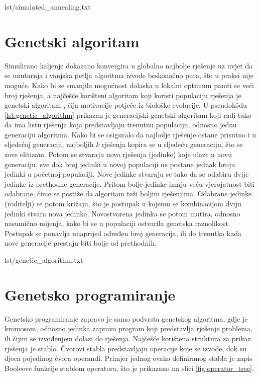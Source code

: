 \begin{minipage}{0.95\textwidth}
     {lst/simulated_annealing.txt}
\end{minipage}


\section{Genetski algoritam}
Simulirano kaljenje dokazano konvergira u globalno najbolje rješenje uz uvjet da se unutarnja i vanjska petlja algoritma izvode beskonačno puta, što u praksi nije moguće.
Kako bi se smanjila mogućnost dolaska u lokalni optimum pamti se veći broj rješenja, a najčešće korišteni algoritam koji koristi populaciju rješenja je genetski algoritam \cite{PrirodomInspirirani}, čija motivacije potječe iz biološke evolucije.
U pseudok\^{o}du \ref{lst:genetic_algorithm} prikazan je generacijski genetski algoritam koji radi tako da ima listu rješenja koja predstavljaju trenutnu populaciju, odnosno jednu generaciju algoritma.
Kako bi se osiguralo da najbolje rješenje ostane prisutno i u sljedećoj generaciji, najboljih $k$ rješenja kopira se u sljedeću generaciju, što se zove elitizam. 
Potom se stvaraju nova rješenja (jedinke) koje ulaze u novu generaciju, sve dok broj jedinki u novoj populaciji ne postane jednak broju jedinki u početnoj populaciji. 
Nove jedinke stvaraju se tako da se odabiru dvije jedinke iz prethodne generacije.
Pritom bolje jedinke imaju veću vjerojatnost biti odabrane, čime se postiže da algoritam teži boljim rješenjima.
Odabrane jedinke (roditelji) se potom križaju, što je postupak u kojemu se kombinacijom dviju jedinki stvara nova jedinka.
Novostvorena jedinka se potom mutira, odnosno nasumično mijenja, kako bi se u populaciji ostvarila genetska raznolikost.
Postupak se ponavlja unaprijed određen broj generacija, ili do trenutka kada nove generacije prestaju biti bolje od prethodnih.

\begin{minipage}{0.95\textwidth}
     {lst/genetic_algorithm.txt}
\end{minipage}


\section{Genetsko programiranje}
Genetsko programiranje \cite{koza1992genetic} zapravo je samo podvrsta genetskog algoritma, gdje je kromosom, odnosno jedinka zapravo program koji predstavlja rješenje problema, ili čijim se izvođenjem dolazi do rješenja.
Najčešće korištena struktura za prikaz rješenja je stablo. 
Čvorovi stabla predstavljaju operacije koje se izvode, dok su djeca pojedinog čvora operandi.
Primjer jednog ovako definiranog stabla je zapis Booleove funkcije stablom operatora, što je prikazano na slici \ref{fig:operator_tree}.
